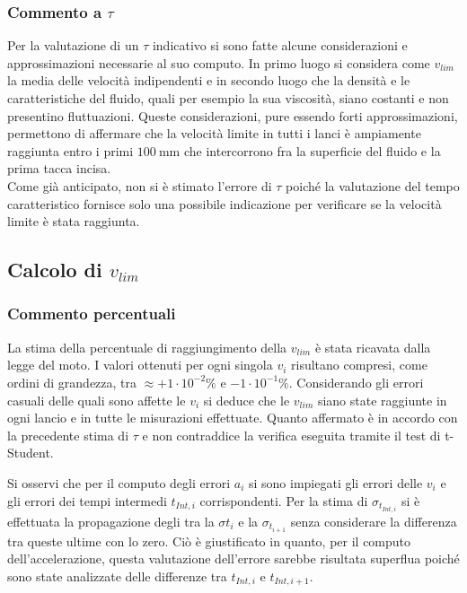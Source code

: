 \documentclass[a4paper,11pt,oneside]{article}
\begin{document}
\subsubsection*{Commento a $\tau$}
Per la valutazione di un $\tau$ indicativo si sono fatte alcune considerazioni e approssimazioni necessarie al suo computo. In primo luogo si considera come $v_{lim}$ la media delle velocità indipendenti e in secondo luogo che la densità e le caratteristiche del fluido, quali per esempio la sua viscosità, siano costanti e non presentino fluttuazioni.
Queste considerazioni, pure essendo forti approssimazioni, permettono di affermare che la velocità limite in tutti i lanci è ampiamente raggiunta entro i primi $\SI{100}{\milli\metre}$ che intercorrono fra la superficie del fluido e la prima tacca incisa.\\
Come già anticipato, non si è stimato l'errore di $\tau$ poiché la valutazione del tempo caratteristico fornisce solo una possibile indicazione per verificare se la velocità limite è stata raggiunta.\newline


\subsection{Calcolo di $v_{lim}$}
\subsubsection*{Commento percentuali}
La stima della percentuale di raggiungimento della $v_{lim}$ è stata ricavata dalla legge del moto. I valori ottenuti per ogni singola $v_{i}$ risultano compresi, come ordini di grandezza, tra $\approx \si{+ 1 \cdot 10^{-2}}\%$ e $ \si{- 1 \cdot 10^{-1}}\%$. Considerando gli errori casuali delle quali sono affette le $v_{i}$ si deduce che le $v_{lim}$ siano state raggiunte in ogni lancio e in tutte le misurazioni effettuate. Quanto affermato è in accordo con la precedente stima di $\tau$ e non contraddice la verifica eseguita tramite il test di t-Student.\newline

Si osservi che per il computo degli errori $a_{i}$ si sono impiegati gli errori delle $v_{i}$ e gli errori dei tempi intermedi $t_{Int, i}$ corrispondenti. Per la stima di $\sigma_{t_{Int, i}}$ si è effettuata la propagazione degli tra la  $\sigma{t_{i}}$ e la $\sigma_{t_{i+1}}$ senza considerare la differenza tra queste ultime con lo zero. Ciò è giustificato in quanto, per il computo dell'accelerazione, questa valutazione dell'errore sarebbe risultata superflua poiché sono state analizzate delle differenze tra $t_{Int, i}$ e $t_{Int, i+1}$. \newline
\end{document}
